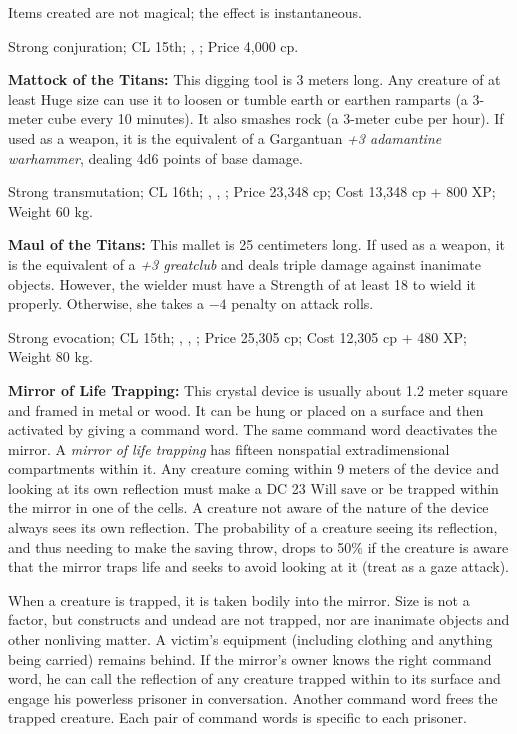 Items created are not magical; the effect is instantaneous.

Strong conjuration; CL 15th; , ; Price 4,000 cp.



\textbf{Mattock of the Titans:} This digging tool is 3 meters long. Any creature of at least Huge size can use it to loosen or tumble earth or earthen ramparts (a 3-meter cube every 10 minutes). It also smashes rock (a 3-meter cube per hour). If used as a weapon, it is the equivalent of a Gargantuan \emph{+3 adamantine warhammer}, dealing 4d6 points of base damage.

Strong transmutation; CL 16th; , , ; Price 23,348 cp; Cost 13,348 cp + 800 XP; Weight 60 kg.



\textbf{Maul of the Titans:} This mallet is 25 centimeters long. If used as a weapon, it is the equivalent of a \emph{+3 greatclub} and deals triple damage against inanimate objects. However, the wielder must have a Strength of at least 18 to wield it properly. Otherwise, she takes a $-4$ penalty on attack rolls.

Strong evocation; CL 15th; , , ; Price 25,305 cp; Cost 12,305 cp + 480 XP; Weight 80 kg.



\textbf{Mirror of Life Trapping:} This crystal device is usually about 1.2 meter square and framed in metal or wood. It can be hung or placed on a surface and then activated by giving a command word. The same command word deactivates the mirror. A \emph{mirror of life trapping} has fifteen nonspatial extradimensional compartments within it. Any creature coming within 9 meters of the device and looking at its own reflection must make a DC 23 Will save or be trapped within the mirror in one of the cells. A creature not aware of the nature of the device always sees its own reflection. The probability of a creature seeing its reflection, and thus needing to make the saving throw, drops to 50\% if the creature is aware that the mirror traps life and seeks to avoid looking at it (treat as a gaze attack).

When a creature is trapped, it is taken bodily into the mirror. Size is not a factor, but constructs and undead are not trapped, nor are inanimate objects and other nonliving matter. A victim's equipment (including clothing and anything being carried) remains behind. If the mirror's owner knows the right command word, he can call the reflection of any creature trapped within to its surface and engage his powerless prisoner in conversation. Another command word frees the trapped creature. Each pair of command words is specific to each prisoner.

